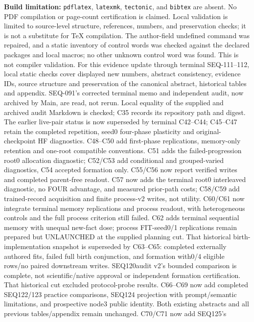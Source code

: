 \documentclass[11pt]{article}
\begin{document}
\textbf{Build limitation:} \texttt{pdflatex}, \texttt{latexmk}, \texttt{tectonic},
and \texttt{bibtex} are absent. No PDF compilation or page-count certification is
claimed. Local validation is limited to source-level structure, references,
numbers, and preservation checks; it is not a substitute for TeX compilation.
The author-field undefined command was repaired, and a static inventory of
control words was checked against the declared packages and local macros; no
other unknown control word was found. This is not compiler validation.
For this evidence update through terminal SEQ-111--112, local static checks cover displayed new numbers,
abstract consistency, evidence IDs, source structure and preservation of the
canonical abstract, historical tables and appendix. SEQ-091's corrected terminal
memo and independent audit, now archived by Main, are read, not rerun. Local
equality of the supplied and archived audit Markdown is checked; C35 records
its repository path and digest. The earlier live-pair status is now superseded
by terminal C42--C44; C45--C47 retain the completed repetition, seed0 four-phase
plasticity and original-checkpoint HF diagnostics. C48--C50 add first-phase
replications, memory-only retention and one-root compatible conventions. C51
adds the failed-progression root0 allocation diagnostic; C52/C53 add conditional
and grouped-varied diagnostics, C54 accepted formation only. C55/C56 now report
verified writes and completed parent-free readout. C57 now adds the terminal
root0 interleaved diagnostic, no FOUR advantage, and measured prior-path costs;
C58/C59 add trained-record acquisition and finite process-v2 writes, not utility.
C60/C61 now integrate terminal memory replications and process readout, with
heterogeneous controls and the full process criterion still failed. C62 adds
terminal sequential memory with unequal new-fact dose; process FIT-seed0/1
replications remain prepared but UNLAUNCHED at the supplied planning cut. That
historical birth-implementation snapshot is superseded by C63--C65: completed
externally authored fits, failed full birth conjunction, and formation with0/4
eligible rows/no paired downstream writes. SEQ120audit v2's bounded comparison
is complete, not scientific/native approval or independent formation certification.
That historical cut excluded protocol-probe results. C66--C69 now add completed
SEQ122/123 practice comparisons, SEQ124 projection with prompt/semantic
limitations, and prospective node3 public identity. Both existing abstracts and
all previous tables/appendix remain unchanged. C70/C71 now add SEQ125's
\end{document}
